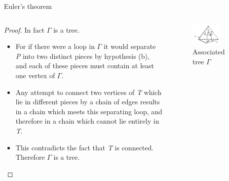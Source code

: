 \documentclass{beamer}
\begin{document}
\begin{frame}{Euler's theorem}
  \begin{columns}
    \begin{column}{0.6\textwidth}
      \begin{proof}
        In fact $\Gamma$ is a tree.
        \begin{itemize}
        \item For if there were a loop in $\Gamma$ it would separate \textsl{P} into two distinct pieces by hypothesis (b), and each of these pieces must contain at least one vertex of $\Gamma$.
        \item Any attempt to connect two vertices of \textsl{T} which lie in different pieces by a chain of edges results in a chain which  meets this separating loop, and therefore in a chain which cannot lie entirely in \textsl{T}.
        \item This contradicts the fact that \textsl{T} is connected. Therefore $\Gamma$ is a tree.
        \end{itemize}
      \end{proof}
    \end{column}
    \begin{column}{0.4\textwidth}
      \begin{figure}
        \centering
        \includegraphics[width=0.7\textwidth]{figure_1_5_c.png}
        \caption{Associated tree $\Gamma$}
      \end{figure}
    \end{column}
  \end{columns}
\end{frame}
\end{document}
